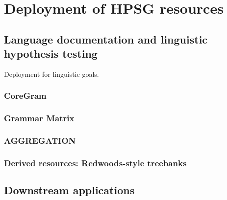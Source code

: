 \documentclass[output=paper]{langsci/langscibook}
\begin{document}




\section{Deployment of HPSG resources}
\label{sec:deployment}

\subsection{Language documentation and linguistic hypothesis testing}

Deployment for linguistic goals.


\subsubsection{CoreGram}

\subsubsection{Grammar Matrix}

\subsubsection{AGGREGATION}

\subsubsection{Derived resources: Redwoods-style treebanks}


\subsection{Downstream applications}
\end{document}
